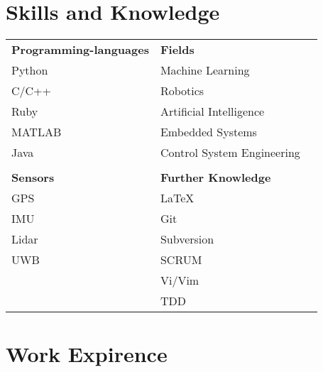 \documentclass[a4paper,10pt]{article} %
\begin{document}
 
\section{Skills and Knowledge}
 
\begin{tabular}{p{7cm}l l}
\textbf{Programming-languages}                & \textbf{Fields}\\
Python                                        & Machine Learning \\
C/C++                                         & Robotics \\ 
Ruby                                          & Artificial Intelligence \\ 
MATLAB                                        & Embedded Systems \\ 
Java                                          & Control System Engineering\\ 
                                              & \\ 
\textbf{Sensors}                              & \textbf{Further Knowledge }\\
GPS                                           & LaTeX\\ 
IMU                                           & Git \\ 
Lidar                                         & Subversion \\ 
UWB                                           & SCRUM \\ 
                                              & Vi/Vim \\
                                              & TDD
\end{tabular}
 
 
\section{Work Expirence}
 
\end{document}
